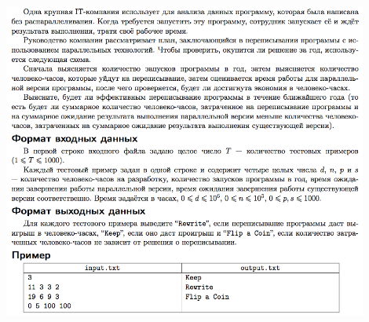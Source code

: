 \documentclass[a4paper,12pt]{article}
\begin{document}
\begin{center}
\includegraphics[width=0.9\textwidth]{OC_Udmurtia/OC_Udmurtia_K.png}\\ [1cm]
\end{center}
\newpage
\end{document}
